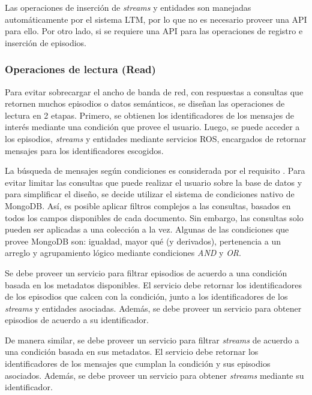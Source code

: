  Las operaciones de inserción de \textit{streams} y entidades son manejadas automáticamente por el sistema LTM, por lo que no es necesario proveer una API para ello. Por otro lado, si se requiere una API para las operaciones de registro e inserción de episodios.

\subsubsection{Operaciones de lectura (Read)}

Para evitar sobrecargar el ancho de banda de red, con respuestas a consultas que retornen muchos episodios o datos semánticos, se diseñan las operaciones de lectura en 2 etapas. Primero, se obtienen los identificadores de los mensajes de interés mediante una condición que provee el usuario. Luego, se puede acceder a los episodios, \textit{streams} y entidades mediante servicios ROS, encargados de retornar mensajes para los identificadores escogidos.

La búsqueda de mensajes según condiciones es considerada por el requisito .
Para evitar limitar las consultas que puede realizar el usuario sobre la base de datos y para simplificar el diseño, se decide utilizar el sistema de condiciones nativo de MongoDB. Así, es posible aplicar filtros complejos a las consultas, basados en todos los campos disponibles de cada documento. Sin embargo, las consultas solo pueden ser aplicadas a una colección a la vez. Algunas de las condiciones que provee MongoDB son: igualdad, mayor qué (y derivados), pertenencia a un arreglo y agrupamiento lógico mediante condiciones \textit{AND} y \textit{OR}.

Se debe proveer un servicio para filtrar episodios de acuerdo a una condición basada en los metadatos disponibles. El servicio debe retornar los identificadores de los episodios que calcen con la condición, junto a los identificadores de los \textit{streams} y entidades asociadas. Además, se debe proveer un servicio para obtener episodios de acuerdo a su identificador.

De manera similar, se debe proveer un servicio para filtrar \textit{streams} de acuerdo a una condición basada en sus metadatos. El servicio debe retornar los identificadores de los mensajes que cumplan la condición y sus episodios asociados. Además, se debe proveer un servicio para obtener \textit{streams} mediante su identificador.

